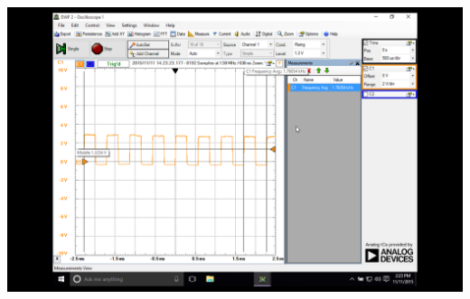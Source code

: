 \documentclass[letterpaper, 12pt]{article}
\begin{document}
\begin{itemize}
\begin{center}
        \includegraphics[scale=0.3]{parta_dad.png}
      \end{center}
\end{itemize}
\end{document}
